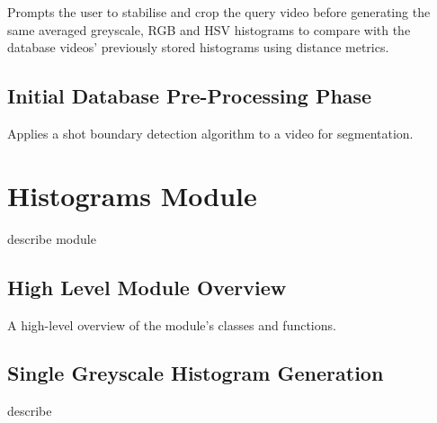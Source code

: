 Prompts the user to stabilise and crop the query video before generating the same averaged greyscale, RGB and HSV histograms to compare with the database videos' previously stored histograms using distance metrics.




\subsection{Initial Database Pre-Processing Phase}
\label{sec:code-database_preprocessing_phase}

Applies a shot boundary detection algorithm to a video for segmentation.




\clearpage
\section{Histograms Module}

describe module


\subsection{High Level Module Overview}
\label{sec:code-high-level-module-overview}

A high-level overview of the module's classes and functions.




\subsection{Single Greyscale Histogram Generation}
\label{sec:code-single_grey_histogram_generation}

describe



